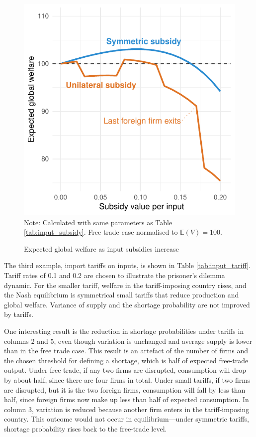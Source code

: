 \documentclass{article}
\begin{document}
\begin{figure}
    \caption{Expected global welfare as input subsidies increase}
    \label{fig:welfare}
    \centering
    \begin{minipage}{0.6\linewidth}
        \includegraphics[width = \linewidth]{welfare.pdf}
        \\
        \small{Note: Calculated with same parameters as Table \ref{tab:input_subsidy}. Free trade case normalised to $\mathbb{E}(V) = 100$.} 
    \end{minipage}
\end{figure}

The third example, import tariffs on inputs, is shown in Table \ref{tab:input_tariff}. Tariff rates of 0.1 and 0.2 are chosen to illustrate the prisoner's dilemma dynamic. For the smaller tariff, welfare in the tariff-imposing country rises, and the Nash equilibrium is symmetrical small tariffs that reduce production and global welfare. Variance of supply and the shortage probability are not improved by tariffs.

One interesting result is the reduction in shortage probabilities under tariffs in columns 2 and 5, even though variation is unchanged and average supply is lower than in the free trade case. This result is an artefact of the number of firms and the chosen threshold for defining a shortage, which is half of expected free-trade output. Under free trade, if any two firms are disrupted, consumption will drop by about half, since there are four firms in total. Under small tariffs, if two firms are disrupted, but it is the two foreign firms, consumption will fall by less than half, since foreign firms now make up less than half of expected consumption. In column 3, variation is reduced because another firm enters in the tariff-imposing country. This outcome would not occur in equilibrium---under symmetric tariffs, shortage probability rises back to the free-trade level.
\end{document}
